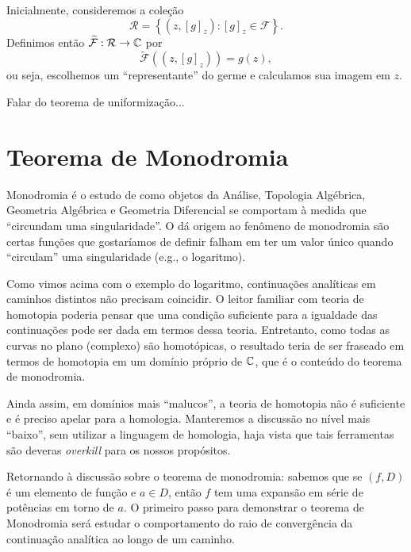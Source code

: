     Inicialmente, consideremos a coleção
    \begin{equation*}
        \mathcal{R} = \left\{ (z, [g]_z) : [g]_z \in \mathcal{F} \right\}.
    \end{equation*}
    Definimos então $\widetilde{\mathcal{F}}:\mathcal{R}\to\mathbb{C}$ por
    \begin{equation*}
        \widetilde{\mathcal{F}}((z, [g]_z)) = g(z),
    \end{equation*}
    ou seja, escolhemos um ``representante'' do germe e calculamos sua imagem em $z$.
    
    {\red Falar do teorema de uniformização...}

\section{Teorema de Monodromia}

    Monodromia é o estudo de como objetos da Análise, Topologia Algébrica, Geometria
    Algébrica e Geometria Diferencial se comportam à medida que 
    ``circundam uma singularidade''. O dá origem ao fenômeno de monodromia são certas
    funções que gostaríamos de definir falham em ter um valor único quando ``circulam''
    uma singularidade (e.g., o logaritmo).
    
    Como vimos acima com o exemplo do logaritmo, continuações analíticas em 
    caminhos distintos não precisam coincidir. O leitor familiar com teoria de
    homotopia poderia pensar que uma condição suficiente para a
    igualdade das continuações pode ser dada em termos dessa teoria. Entretanto,
    como todas as curvas no plano (complexo) são homotópicas, o resultado teria
    de ser fraseado em termos de homotopia em um domínio próprio de $\mathbb{C}$,
    que é o conteúdo do teorema de monodromia.
    
    Ainda assim, em domínios mais ``malucos'', a teoria de homotopia não é suficiente
    e é preciso apelar para a homologia. Manteremos a discussão no nível mais ``baixo'',
    sem utilizar a linguagem de homologia, haja vista que tais
    ferramentas são deveras \textit{overkill} para os nossos propósitos.
    
    Retornando à discussão sobre o teorema de monodromia: sabemos que se $(f,D)$ é
    um elemento de função e $a\in D$, então $f$ tem uma expansão em série de potências
    em torno de $a$. O primeiro passo para demonstrar o teorema de Monodromia será
    estudar o comportamento do raio de convergência da continuação analítica ao longo
    de um caminho.

